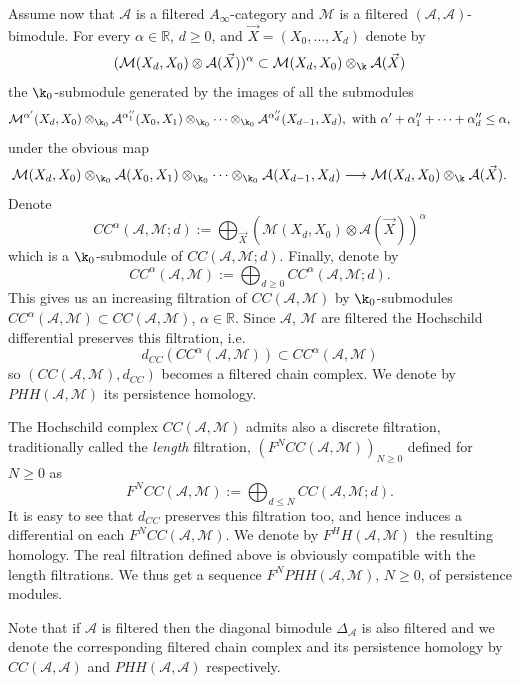Assume now that $\mathcal{A}$ is a filtered $A_{\infty}$-category and
$\mathcal{M}$ is a filtered $(\mathcal{A}, \mathcal{A})$-bimodule.
For every $\alpha \in \mathbb{R}$, $d \geq 0$, and
$\vec{X} = (X_0, \ldots, X_d)$ denote by
$$( \mathcal{M}(X_d, X_0) \otimes \mathcal{A}(\vec{X}) )^{\alpha}
\subset \mathcal{M}(X_d,X_0) \otimes_{\k} \mathcal{A}(\vec{X})$$ the
$\k_0$-submodule generated by the images of all the submodules
$$\mathcal{M}^{\alpha'}(X_d, X_0) \otimes_{\k_0}
\mathcal{A}^{\alpha''_1}(X_0, X_1) \otimes_{\k_0} \cdots
\otimes_{\k_0}\mathcal{A}^{\alpha''_d}(X_{d-1}, X_d) , \text{ with }
\alpha' + \alpha''_1 + \cdots + \alpha''_d \leq \alpha,$$ under the
obvious map
$$\mathcal{M}(X_d, X_0) \otimes_{\k_0} \mathcal{A}(X_0, X_1) \otimes_{\k_0} \cdots
\otimes_{\k_0}\mathcal{A}(X_{d-1}, X_d) \longrightarrow
\mathcal{M}(X_d, X_0) \otimes_{\k} \mathcal{A}(\vec{X}).$$ Denote
$$CC^{\alpha}(\mathcal{A}, \mathcal{M}; d) := \bigoplus_{\vec{X}}
( \mathcal{M}(X_d,X_0) \otimes \mathcal{A}(\vec{X}) )^{\alpha}$$ which
is a $\k_0$-submodule of $CC(\mathcal{A}, \mathcal{M}; d)$. Finally,
denote by
$$CC^{\alpha}(\mathcal{A}, \mathcal{M}) := \bigoplus_{d \geq 0}
CC^{\alpha}(\mathcal{A}, \mathcal{M}; d).$$ This gives us an
increasing filtration of $CC(\mathcal{A}, \mathcal{M})$ by
$\k_0$-submodules
$CC^{\alpha}(\mathcal{A}, \mathcal{M}) \subset CC(\mathcal{A},
\mathcal{M})$, $\alpha \in \mathbb{R}$. Since $\mathcal{A}$,
$\mathcal{M}$ are filtered the Hochschild differential preserves this
filtration, i.e.
$$d_{CC}(CC^{\alpha}(\mathcal{A}, \mathcal{M})) \subset
CC^{\alpha}(\mathcal{A}, \mathcal{M})$$ so
$(CC(\mathcal{A}, \mathcal{M}), d_{CC})$ becomes a filtered chain
complex. We denote by $PHH(\mathcal{A}, \mathcal{M})$ its persistence
homology.

The Hochschild complex $CC(\mathcal{A},\mathcal{M})$ admits also a discrete filtration, traditionally called the \textit{length} filtration, $(F^NCC(\mathcal{A},\mathcal{M}))_{N\geq 0}$ defined for $N\geq 0$ as $$F^NCC(\mathcal{A},\mathcal{M}):=\bigoplus_{d\leq N}CC(\mathcal{A},\mathcal{M};d).$$ It is easy to see that $d_{CC}$ preserves this filtration too, and hence induces a differential on each $F^NCC(\mathcal{A},\mathcal{M})$. We denote by $F^HH(\mathcal{A},\mathcal{M})$ the resulting homology. The real filtration defined above is obviously compatible with the length filtrations. We thus get a sequence $F^NPHH(\mathcal{A},\mathcal{M})$, $N\geq 0$, of persistence modules.

Note that if $\mathcal{A}$ is filtered then the diagonal bimodule
$\Delta_{\mathcal{A}}$ is also filtered and we denote the
corresponding filtered chain complex and its persistence homology by
$CC(\mathcal{A}, \mathcal{A})$ and $PHH(\mathcal{A}, \mathcal{A})$
respectively.

